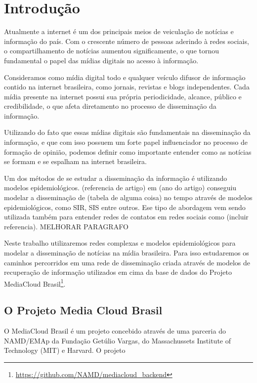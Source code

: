 \documentclass[a4paper,12pt]{article}
\begin{document}
\pagebreak

\section{Introdução}

Atualmente a internet é um dos principais meios de veiculação de notícias e informação do país. Com o crescente
número de pessoas aderindo à redes sociais, o compartilhamento de notícias aumentou significamente, o que tornou fundamental
o papel das mídias digitais no acesso à informação.

Consideramos como mídia digital todo e qualquer veículo difusor de informação contido na internet brasileira, como jornais, revistas e 
blogs independentes. Cada mídia presente na internet possui sua própria periodicidade, alcance, público e credibilidade, o que afeta
diretamento no processo de disseminação da informação.

Utilizando do fato que essas mídias digitais são fundamentais na disseminação da informação, e que com isso possuem um forte papel 
influenciador no processo de formação de opinião, podemos definir como importante entender como as notícias se formam e se espalham
na internet brasileira.

Um dos métodos de se estudar a disseminação da informação é utilizando modelos epidemiológicos. (referencia de artigo) em (ano do artigo)
conseguiu modelar a disseminação de (tabela de alguma coisa) no tempo através de modelos epidemiológicos, como SIR, SIS entre outros. Ese tipo
de abordagem vem sendo utilizada também para entender redes de contatos em redes sociais como (incluir referencia). MELHORAR PARAGRAFO

Neste trabalho utilizaremos redes complexas e modelos epidemiológicos para modelar a disseminação de notícias na mídia brasileira. 
Para isso
estudaremos os caminhos percorridos em uma rede de disseminação criada através de modelos de recuperação de informação utilizados em cima
da base de dados do Projeto MediaCloud Brasil\footnote[1]{\url{https://github.com/NAMD/mediacloud_backend}}.


\subsection{O Projeto Media Cloud Brasil}

 O MediaCloud Brasil é um projeto concebido através de uma parceria do NAMD/EMAp da Fundação Getúlio Vargas, do Massachussets Institute of
 Technology (MIT)  e Harvard. O projeto
\end{document}

